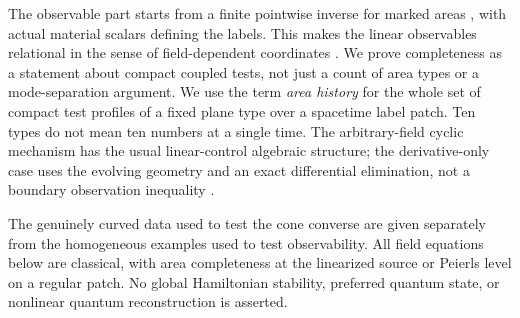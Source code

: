 \documentclass[11pt]{article}
\begin{document}
The observable part starts from a finite pointwise inverse for marked areas \cite{P47}, with actual material scalars defining the labels. This makes the linear observables relational in the sense of field-dependent coordinates \cite{Khavkine,BFR}. We prove completeness as a statement about compact coupled tests, not just a count of area types or a mode-separation argument. We use the term \emph{area history} for the whole set of compact test profiles of a fixed plane type over a spacetime label patch. Ten types do not mean ten numbers at a single time. The arbitrary-field cyclic mechanism has the usual linear-control algebraic structure; the derivative-only case uses the evolving geometry and an exact differential elimination, not a boundary observation inequality \cite{GKM}.

The genuinely curved data used to test the cone converse are given separately from the homogeneous examples used to test observability. All field equations below are classical, with area completeness at the linearized source or Peierls level on a regular patch. No global Hamiltonian stability, preferred quantum state, or nonlinear quantum reconstruction is asserted.






\end{document}
